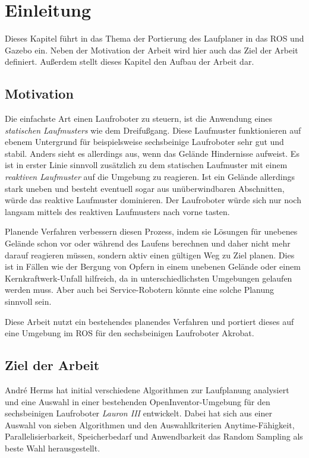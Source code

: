 \chapter{Einleitung}
\label{kap1}

Dieses Kapitel führt in das Thema der Portierung des Laufplaner in das \ac{ROS} und Gazebo ein. Neben der Motivation der Arbeit wird hier auch das Ziel der Arbeit definiert. Außerdem stellt dieses Kapitel den Aufbau der Arbeit dar. 

\section{Motivation}

Die einfachste Art einen Laufroboter zu steuern, ist die Anwendung eines \emph{statischen Laufmusters} wie dem Dreifußgang. Diese Laufmuster funktionieren auf ebenem Untergrund für beispielsweise sechsbeinige Laufroboter sehr gut und stabil. Anders sieht es allerdings aus, wenn das Gelände Hindernisse aufweist. Es ist in erster Linie sinnvoll zusätzlich zu dem statischen Laufmuster mit einem \emph{reaktiven Laufmuster} auf die Umgebung zu reagieren. Ist ein Gelände allerdings stark uneben und besteht eventuell sogar aus unüberwindbaren Abschnitten, würde das reaktive Laufmuster dominieren. Der Laufroboter würde sich nur noch langsam mittels des reaktiven Laufmusters nach vorne tasten.

Planende Verfahren verbessern diesen Prozess, indem sie Lösungen für unebenes Gelände schon vor oder während des Laufens berechnen und daher nicht mehr darauf reagieren müssen, sondern aktiv einen gültigen Weg zu Ziel planen. Dies ist in Fällen wie der Bergung von Opfern in einem unebenen Gelände oder einem Kernkraftwerk-Unfall hilfreich, da in unterschiedlichsten Umgebungen gelaufen werden muss. Aber auch bei Service-Robotern könnte eine solche Planung sinnvoll sein.

Diese Arbeit nutzt ein bestehendes planendes Verfahren und portiert dieses auf eine Umgebung im \ac{ROS} für den sechsbeinigen Laufroboter Akrobat.

\section{Ziel der Arbeit}

André Herms \autocite{herms2004} hat initial verschiedene Algorithmen zur Laufplanung analysiert und eine Auswahl in einer bestehenden OpenInventor-Umgebung \autocite{inventor} für den sechsbeinigen Laufroboter \emph{Lauron III} entwickelt. Dabei hat sich aus einer Auswahl von sieben Algorithmen und den Auswahlkriterien Anytime-Fähigkeit, Parallelisierbarkeit, Speicherbedarf und Anwendbarkeit das Random Sampling als beste Wahl herausgestellt.

